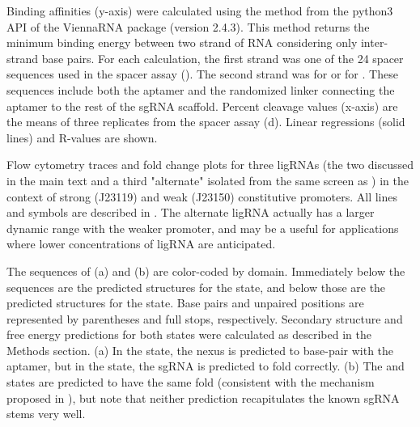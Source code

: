 \documentclass[10pt,oneside]{article}
\begin{document}
     Binding affinities (y-axis) were calculated using the  method from the python3 API of the ViennaRNA package (version 2.4.3).  This method returns the minimum binding energy between two strand of RNA considering only inter-strand base pairs.  For each calculation, the first strand was one of the 24  spacer sequences used in the \invitro{} spacer assay ().  The second strand was  for \ligrnaF{} or  for \ligrnaB{}.  These sequences include both the aptamer and the randomized linker connecting the aptamer to the rest of the sgRNA scaffold.  Percent cleavage values (x-axis) are the means of three replicates from the \invitro{} spacer assay (d).  Linear regressions (solid lines) and R-values are shown.



      Flow cytometry traces and fold change plots for three ligRNAs (the two discussed in the main text and a third "alternate" isolated from the same screen as \ligrnaF{}) in the context of strong (J23119) and weak (J23150) constitutive promoters.  All lines and symbols are described in .  The alternate ligRNA actually has a larger dynamic range with the weaker promoter, and may be a useful for applications where lower concentrations of ligRNA are anticipated.



     The sequences of \ligrnaF{} (a) and \ligrnaB{} (b) are color-coded by domain.  Immediately below the sequences are the predicted structures for the \apo{} state, and below those are the predicted structures for the \holo{} state.  Base pairs and unpaired positions are represented by parentheses and full stops, respectively.  Secondary structure and free energy predictions for both states were calculated as described in the Methods section.  (a) In the \apo{} state, the nexus is predicted to base-pair with the aptamer, but in the \holo{} state, the sgRNA is predicted to fold correctly.  (b) The \apo{} and \holo{} states are predicted to have the same fold (consistent with the mechanism proposed in ), but note that neither prediction recapitulates the known sgRNA stems very well.
\end{document}
